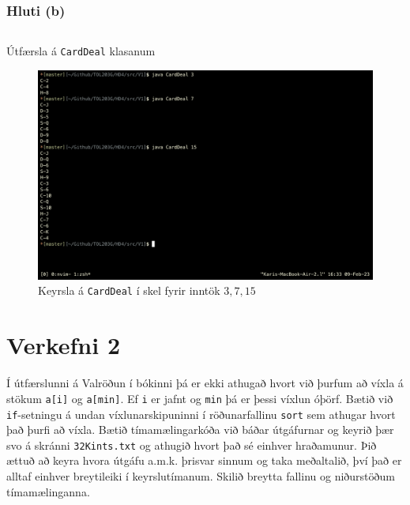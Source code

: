 \documentclass[12pt, a4paper, hidelinks]{article}
\begin{document}
\subsubsection*{Hluti (b)}

\begin{listing}[H]
    \centering
    \inputminted[linenos, frame=single, fontsize=\footnotesize]{java}{../src/V1/CardDeal.java}
    \caption{Útfærsla á \texttt{CardDeal} klasanum}
    \label{forrit:CardDeal}
\end{listing}

\begin{figure}[H]
    \centering
    \includegraphics[width=\textwidth]{img/CardDeal_keyrsla.png}
    \caption{Keyrsla á \texttt{CardDeal} í skel fyrir inntök $3, 7, 15$}
    \label{mynd:CardDeal_keyrsla}
\end{figure}

\newpage

\section*{Verkefni 2}
Í útfærslunni á Valröðun í bókinni þá er ekki athugað hvort við þurfum að víxla á stökum \texttt{a[i]} og \texttt{a[min]}.
Ef \texttt{i} er jafnt og \texttt{min} þá er þessi víxlun óþörf. Bætið við \texttt{if}-setningu á undan víxlunarskipuninni
í röðunarfallinu \texttt{sort} sem athugar hvort það þurfi að víxla. Bætið tímamælingarkóða við báðar útgáfurnar og keyrið þær
svo á skránni \texttt{32Kints.txt} og athugið hvort það sé einhver hraðamunur. Þið ættuð að keyra hvora útgáfu a.m.k. þrisvar
sinnum og taka meðaltalið, því það er alltaf einhver breytileiki í keyrslutímanum. Skilið breytta fallinu og niðurstöðum
tímamælinganna.
\end{document}
